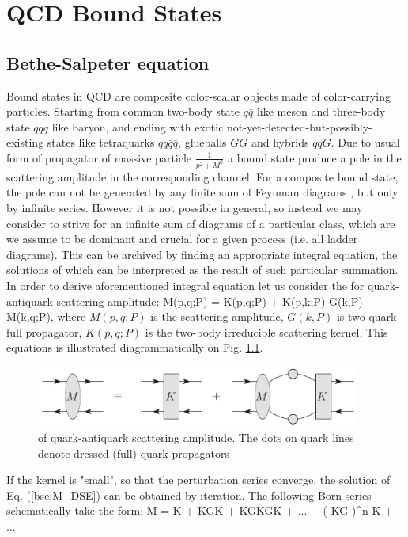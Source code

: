 \chapter{QCD Bound States}
\label{chap:BSE}
\section{Bethe-Salpeter equation}
\label{bse}
Bound states in QCD are composite color-scalar objects made of color-carrying particles. Starting from common two-body state $q \bar q$ like meson and three-body state $qqq$ like baryon, and ending with exotic not-yet-detected-but-possibly-existing states like tetraquarks $qq \bar q \bar q$, glueballs $GG$ and hybrids $qqG$. Due to usual form of propagator of massive particle $\frac{1}{p^2 + M^2}$ a bound state produce a pole in the scattering amplitude in the corresponding channel. For a composite bound state, the pole can not be generated by any finite sum of Feynman diagrams \cite{9780471353867}, but only by infinite series. However it is not possible in general, so instead we may consider to strive for an infinite sum of diagrams of a particular class, which are we assume to be dominant and crucial for a given process (i.e. all ladder diagrams). This can be archived by finding an appropriate integral equation, the solutions of which can be interpreted as the result of such particular summation. \\

	In order to derive aforementioned integral equation let us consider the \DSE for quark-antiquark scattering amplitude:
\beqa
	M(p,q;P) = K(p,q;P) + \int {} K(p,k;P) G(k,P) M(k,q;P)\;,
	\label{bse:M_DSE}
\eeqa
where $M(p,q;P)$ is the scattering amplitude, $G(k,P)$ is two-quark full propagator, $K(p,q;P)$ is the two-body irreducible scattering kernel. This equations is illustrated diagrammatically on Fig. \ref{fig:M_DSE}.
\begin{figure}[H]
\tiny
 \begin{center}
  \includegraphics[width=0.95\textwidth]{figures/M_DSE}
 \end{center}
 \caption{\footnotesize \DSE  of quark-antiquark scattering amplitude. The dots on quark lines denote dressed (full) quark propagators }\label{fig:M_DSE} 
\end{figure}
If the kernel is "small", so that the perturbation series converge, the solution of Eq. (\ref{bse:M_DSE}) can be obtained by iteration. The following Born series schematically take the form:
\beqa
	M = K + \int KGK + \int \int KGKGK + \;...\; + \left(  \int KG \right)^n K +\; ...
	\label{bse:M_sum}
\eeqa

